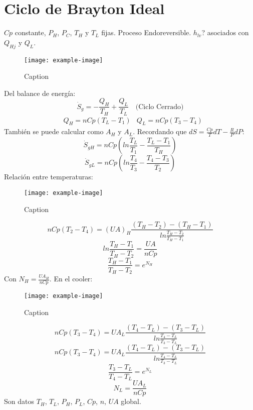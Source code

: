\documentclass{article}
\begin{document}
\section{Ciclo de Brayton Ideal}
$Cp$ constante, $P_H$, $P_C$, $T_H$ y $T_L$ fijas. Proceso Endoreversible. $h_{lv}$? asociados con $Q_{Hj}$ y $Q_L$.
\begin{figure}[H]
    \centering
    \texttt{[image: example-image]}
    \caption{Caption}
\end{figure}
Del balance de energía:
\begin{equation}
    \dot{S}_g=-\frac{Q_H}{T_H}+\frac{Q_L}{T_L}\quad\text{(Ciclo Cerrado)}
\end{equation}
\begin{align}
    &Q_H=nCp\left(T_L-T_1\right) & Q_L=nCp\left(T_3-T_4\right)
\end{align}
También se puede calcular como $A_H$ y $A_L$. Recordando que $dS=\frac{Cp}{T}dT-\frac{R}{P}dP$:
\begin{equation}
    \dot{S}_{gH}=nCp\left(ln\left.\frac{T_L}{T_1}\right.-\frac{T_L-T_1}{T_H}\right)
\end{equation}
\begin{equation}
    \dot{S}_{gL}=nCp\left(ln\left.\frac{T_4}{T_3}\right.-\frac{T_4-T_3}{T_2}\right)
\end{equation}
Relación entre temperaturas:
\begin{figure}[H]
    \centering
    \texttt{[image: example-image]}
    \caption{Caption}
\end{figure}
\begin{equation}
    nCp\left(T_2-T_4\right)=\left(UA\right)_H\frac{\left(T_H-T_2\right)-\left(T_H-T_1\right)}{ln\left.\frac{T_H-T_2}{T_H-T_1}\right.}
\end{equation}
\begin{equation}
    ln\left.\frac{T_H-T_1}{T_H-T_2}\right.=\frac{UA}{nCp}
\end{equation}
\begin{equation}
    \frac{T_H-T_1}{T_H-T_2}=e^{N_H}
\end{equation}
Con $N_H=\frac{UA_H}{nCp}$.
En el cooler:
\begin{figure}[H]
    \centering
    \texttt{[image: example-image]}
    \caption{Caption}
\end{figure}
\begin{equation}
    nCp\left(T_3-T_4\right)=UA_L\frac{\left(T_4-T_L\right)-\left(T_3-T_L\right)}{ln\left.\frac{T_4-T_L}{T_3-T_L}\right.}
\end{equation}
\begin{equation}
    nCp\left(T_3-T_4\right)=UA_L\frac{\left(T_4-T_L\right)-\left(T_3-T_L\right)}{ln\left.\frac{T_4-T_L}{T_3-T_L}\right.}
\end{equation}
\begin{equation}
    \frac{T_3-T_L}{T_4-T_L}=e^{N_L}
\end{equation}
\begin{equation}
    N_L=\frac{UA_L}{nCp}
\end{equation}
Son datos $T_H$, $T_L$, $P_H$, $P_L$, $Cp$, $n$, $UA$ global.
\end{document}
